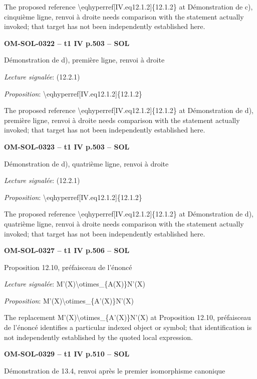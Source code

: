 The proposed reference \textbackslash{}eqhyperref[IV.eq12.1.2]\{12.1.2\} at Démonstration de c), cinquième ligne, renvoi à droite needs comparison with the statement actually invoked; that target has not been independently established here.\par
\par\noindent\textbf{OM-SOL-0322 -- t1 IV p.503 -- SOL}\par
Démonstration de d), première ligne, renvoi à droite\par
\emph{Lecture signalée}: (12.2.1)\par
\emph{Proposition}: \textbackslash{}eqhyperref[IV.eq12.1.2]\{12.1.2\}\par
The proposed reference \textbackslash{}eqhyperref[IV.eq12.1.2]\{12.1.2\} at Démonstration de d), première ligne, renvoi à droite needs comparison with the statement actually invoked; that target has not been independently established here.\par
\par\noindent\textbf{OM-SOL-0323 -- t1 IV p.503 -- SOL}\par
Démonstration de d), quatrième ligne, renvoi à droite\par
\emph{Lecture signalée}: (12.2.1)\par
\emph{Proposition}: \textbackslash{}eqhyperref[IV.eq12.1.2]\{12.1.2\}\par
The proposed reference \textbackslash{}eqhyperref[IV.eq12.1.2]\{12.1.2\} at Démonstration de d), quatrième ligne, renvoi à droite needs comparison with the statement actually invoked; that target has not been independently established here.\par
\par\noindent\textbf{OM-SOL-0327 -- t1 IV p.506 -- SOL}\par
Proposition 12.10, préfaisceau de l'énoncé\par
\emph{Lecture signalée}: M'(X)\textbackslash{}otimes\_\{A(X)\}N'(X)\par
\emph{Proposition}: M'(X)\textbackslash{}otimes\_\{A'(X)\}N'(X)\par
The replacement M'(X)\textbackslash{}otimes\_\{A'(X)\}N'(X) at Proposition 12.10, préfaisceau de l'énoncé identifies a particular indexed object or symbol; that identification is not independently established by the quoted local expression.\par
\par\noindent\textbf{OM-SOL-0329 -- t1 IV p.510 -- SOL}\par
Démonstration de 13.4, renvoi après le premier isomorphisme canonique\par

